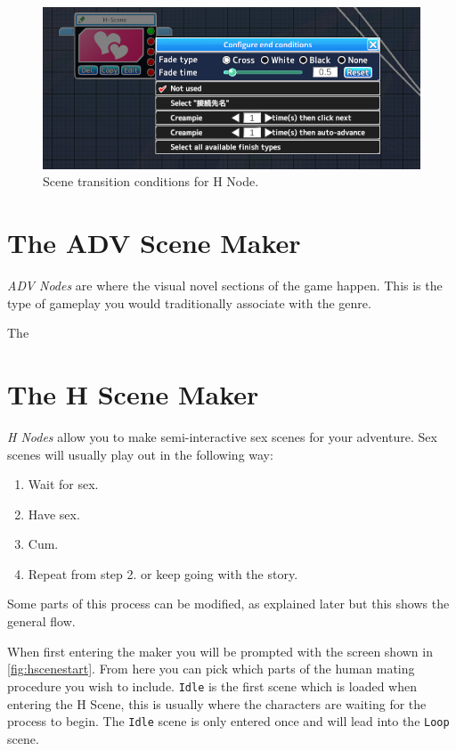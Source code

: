 \documentclass{report}
\begin{document}
\begin{figure}[!htpb]
    \centering
    \includegraphics[width=\textwidth]{Figures/h_node.PNG}
    \caption{Scene transition conditions for H Node.}
    \label{fig:hnode}
\end{figure}

\section{The ADV Scene Maker}

\textit{ADV Nodes} are where the visual novel sections of the game happen. This is the type of gameplay you would traditionally associate with the genre.

The 

\section{The H Scene Maker}

\textit{H Nodes} allow you to make semi-interactive sex scenes for your adventure. Sex scenes will usually play out in the following way:

\begin{enumerate}
    \item Wait for sex.
    \item Have sex.
    \item Cum.
    \item Repeat from step 2. or keep going with the story.
\end{enumerate}

Some parts of this process can be modified, as explained later but this shows the general flow.

When first entering the maker you will be prompted with the screen shown in \ref{fig:hscenestart}. From here you can pick which parts of the human mating procedure you wish to include. \texttt{Idle} is the first scene which is loaded when entering the H Scene, this is usually where the characters are waiting for the process to begin. The \texttt{Idle} scene is only entered once and will lead into the \texttt{Loop} scene.
\end{document}
